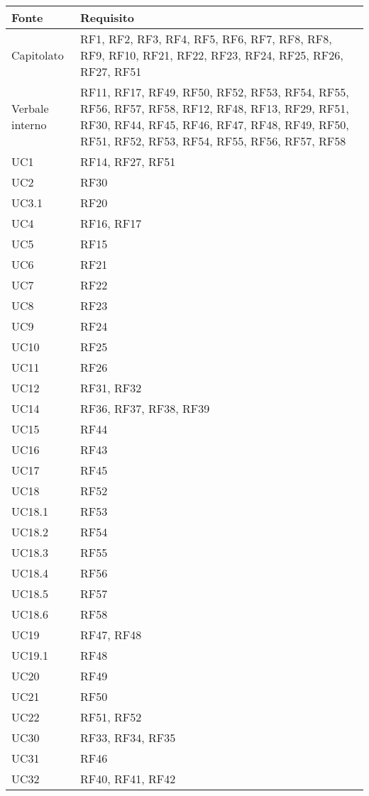 \begin{center}
  \begin{longtable}{|C{5cm}|C{5cm}|}
    \hline
    \textbf{Fonte} & \textbf{Requisito} \\
    \hline
    Capitolato & RF1, RF2, RF3, RF4, RF5, RF6, RF7, RF8, RF8, RF9, RF10, RF21, RF22, RF23, RF24, RF25, RF26, RF27, RF51 \\
    \hline
    Verbale interno & RF11, RF17, RF49, RF50, RF52, RF53, RF54, RF55, RF56, RF57, RF58, RF12, RF48, RF13, RF29, RF51, RF30, RF44, RF45, RF46, RF47, RF48, RF49, RF50, RF51, RF52, RF53, RF54, RF55, RF56, RF57, RF58 \\
    \hline
    UC1 & RF14, RF27, RF51 \\
    \hline
    UC2 & RF30 \\
    \hline
    UC3.1 & RF20 \\
    \hline
    UC4 & RF16, RF17 \\
    \hline
    UC5 & RF15 \\
    \hline
    UC6 & RF21 \\
    \hline
    UC7 & RF22 \\
    \hline
    UC8 & RF23 \\
    \hline
    UC9 & RF24 \\
    \hline
    UC10 & RF25 \\
    \hline
    UC11 & RF26 \\
    \hline
    UC12 & RF31, RF32 \\
    \hline
    UC14 & RF36, RF37, RF38, RF39 \\
    \hline
    UC15 & RF44 \\
    \hline
    UC16 & RF43 \\
    \hline
    UC17 & RF45 \\
    \hline
    UC18 & RF52 \\
    \hline
    UC18.1 & RF53 \\
    \hline
    UC18.2 & RF54 \\
    \hline
    UC18.3 & RF55 \\
    \hline
    UC18.4 & RF56 \\
    \hline
    UC18.5 & RF57 \\
    \hline
    UC18.6 & RF58 \\
    \hline
    UC19 & RF47, RF48 \\
    \hline
    UC19.1 & RF48 \\
    \hline
    UC20 & RF49 \\
    \hline
    UC21 & RF50 \\
    \hline
    UC22 & RF51, RF52 \\
    \hline
    UC30 & RF33, RF34, RF35 \\
    \hline
    UC31 & RF46 \\
    \hline
    UC32 & RF40, RF41, RF42 \\
    \hline
\end{longtable}
\end{center}
